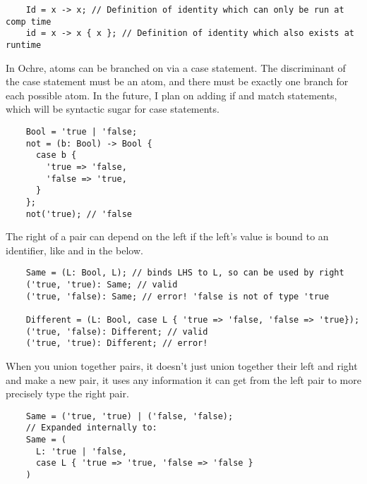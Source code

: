 \documentclass[12pt,twoside]{report}
\begin{document}
\begin{listing}[H]
  \begin{verbatim}
    Id = x -> x; // Definition of identity which can only be run at comp time
    id = x -> x { x }; // Definition of identity which also exists at runtime
  \end{verbatim}
\end{listing}

In Ochre, atoms can be branched on via a case statement. The discriminant of the case statement must be an atom, and there must be exactly one branch for each possible atom. In the future, I plan on adding if and match statements, which will be syntactic sugar for case statements.

\begin{listing}[H]
  \begin{verbatim}
    Bool = 'true | 'false;
    not = (b: Bool) -> Bool {
      case b {
        'true => 'false,
        'false => 'true,
      }
    };
    not('true); // 'false
  \end{verbatim}
\end{listing}

The right of a pair can depend on the left if the left's value is bound to an identifier, like  and  in the below.

\begin{listing}[H]
  \begin{verbatim}
    Same = (L: Bool, L); // binds LHS to L, so can be used by right
    ('true, 'true): Same; // valid
    ('true, 'false): Same; // error! 'false is not of type 'true

    Different = (L: Bool, case L { 'true => 'false, 'false => 'true});
    ('true, 'false): Different; // valid
    ('true, 'true): Different; // error!
  \end{verbatim}
\end{listing}

When you union together pairs, it doesn't just union together their left and right and make a new pair, it uses any information it can get from the left pair to more precisely type the right pair.

\begin{listing}[H]
  \begin{verbatim}
    Same = ('true, 'true) | ('false, 'false);
    // Expanded internally to:
    Same = (
      L: 'true | 'false,
      case L { 'true => 'true, 'false => 'false }
    )
  \end{verbatim}
\end{listing}
\end{document}
